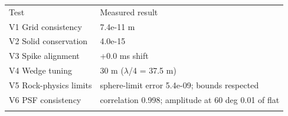 \begin{tabular}{ll}
\tophline
Test & Measured result \\
\middlehline
V1 Grid consistency & 7.4e-11 m \\
V2 Solid conservation & 4.0e-15 \\
V3 Spike alignment & +0.0 ms shift \\
V4 Wedge tuning & 30 m ($\lambda$/4 = 37.5 m) \\
V5 Rock-physics limits & sphere-limit error 5.4e-09; bounds respected \\
V6 PSF consistency & correlation 0.998; amplitude at 60 deg 0.01 of flat \\
\bottomhline
\end{tabular}
